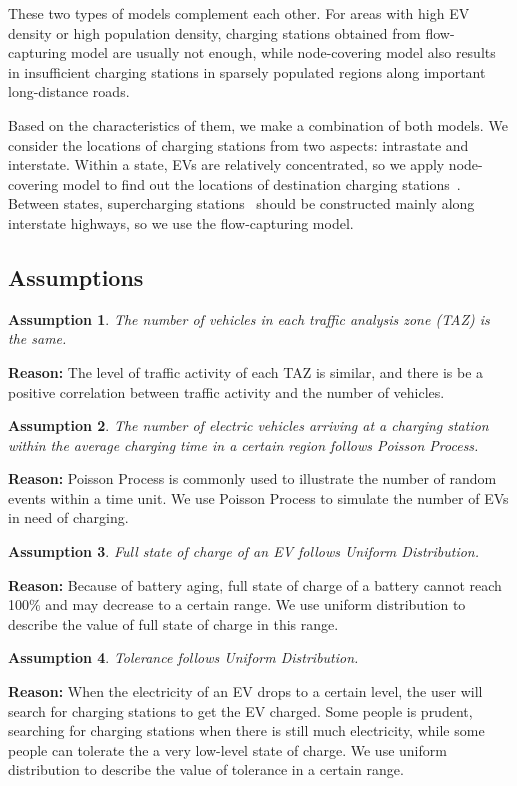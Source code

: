 \documentclass{mcmthesis}
\newtheorem{myassump}{Assumption}
\begin{document}
These two types of models complement each other. For areas with high EV density or high population density, charging stations obtained from flow-capturing model are usually not enough, while node-covering model also results in insufficient charging stations in sparsely populated regions along important long-distance roads.

Based on the characteristics of them, we make a combination of both models. We consider the locations of charging stations from two aspects: intrastate and interstate. Within a state, EVs are relatively concentrated, so we apply node-covering model to find out the locations of destination charging stations~\cite{DestinationCharging}. Between states, supercharging stations~\cite{Supercharging} should be constructed mainly along interstate highways, so we use the flow-capturing model.
\subsection{Assumptions}
\begin{myassump}\label{Assump-TAZ}
The number of vehicles in each traffic analysis zone (TAZ) is the same.
\end{myassump}
\noindent\textbf{Reason:} The level of traffic activity of each TAZ is similar, and there is be a positive correlation between traffic activity and the number of vehicles.

\begin{myassump}\label{Assump-Poisson}
The number of electric vehicles arriving at a charging station within the average charging time in a certain region follows Poisson Process.
\end{myassump}
\noindent\textbf{Reason:} Poisson Process is commonly used to illustrate the number of random events within a time unit. We use Poisson Process to simulate the number of EVs in need of charging.

\begin{myassump}\label{Assump-FullSOC}
Full state of charge of an EV follows Uniform Distribution.
\end{myassump}
\noindent\textbf{Reason:} Because of battery aging, full state of charge of a battery cannot reach 100\% and may decrease to a certain range. We use uniform distribution to describe the value of full state of charge in this range.

\begin{myassump}\label{Assump-Tolerance}
Tolerance follows Uniform Distribution.
\end{myassump}
\noindent\textbf{Reason:} When the electricity of an EV drops to a certain level, the user will search for charging stations to get the EV charged. Some people is prudent, searching for charging stations when there is still much electricity, while some people can tolerate the a very low-level state of charge. We use uniform distribution to describe the value of tolerance in a certain range.
\end{document}
